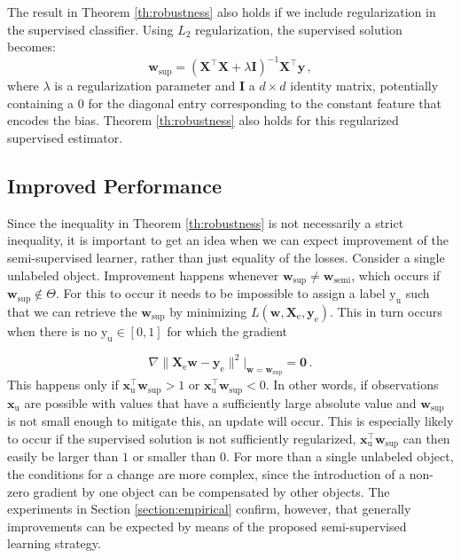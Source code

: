 \documentclass[smallcondensed]{svjour3}\usepackage[]{graphicx}\usepackage[]{color}
\renewcommand{\vec}[1]{\mathbf{#1}}
\begin{document}
The result in Theorem \ref{th:robustness} also holds if we include regularization in the supervised classifier. Using $L_2$ regularization, the supervised solution becomes:
\begin{equation}
\label{eq:regsupervisedsolution}
\vec{w}_{\text{sup}} = (\vec{X}^\top \vec{X} + \lambda \vec{I})^{-1} \vec{X}^\top \vec{y} \,, \nonumber
\end{equation}
where $\lambda$ is a regularization parameter and $\vec{I}$ a $d \times d$ identity matrix, potentially containing a $0$ for the diagonal entry corresponding to the constant feature that encodes the bias. Theorem \ref{th:robustness} also holds for this regularized supervised estimator.

\subsection{Improved Performance}
Since the inequality in Theorem \ref{th:robustness} is not necessarily a strict inequality, it is important to get an idea when we can expect improvement of the semi-supervised learner, rather than just equality of the losses. Consider a single unlabeled object. Improvement happens whenever $\vec{w}_\text{sup} \neq \vec{w}_\text{semi}$, which occurs if $\vec{w}_\text{sup} \notin \Theta$.  For this to occur it needs to be impossible to assign a label $\text{y}_\text{u}$ such that we can retrieve the $\vec{w}_\text{sup}$ by minimizing $L(\vec{w},\vec{X}_\text{e},\vec{y}_\text{e})$. This in turn occurs when there is no $\text{y}_\text{u} \in [0,1]$ for which the gradient

\begin{equation}
\nabla \lVert \vec{X}_\text{e} \vec{w} - \vec{y}_\text{e} \rVert^2\bigg|_{\vec{w}=\vec{w}_\text{sup}}=\vec{0}  \, . \nonumber
\end{equation}
This happens only if $\vec{x}_\text{u}^\top \vec{w}_\text{sup} > 1$ or $\vec{x}_\text{u}^\top \vec{w}_\text{sup} < 0$. In other words, if observations $\vec{x}_\text{u}$ are possible with values that have a sufficiently large absolute value and $\vec{w}_\text{sup}$ is not small enough to mitigate this, an update will occur. This is especially likely to occur if the supervised solution is not sufficiently regularized, $\vec{x}_\text{u}^\top \vec{w}_\text{sup}$ can then easily be larger than $1$ or smaller than $0$. For more than a single unlabeled object, the conditions for a change are more complex, since the introduction of a non-zero gradient by one object can be compensated by other objects. The experiments in Section \ref{section:empirical} confirm, however, that generally improvements can be expected by means of the proposed semi-supervised learning strategy.
\end{document}
